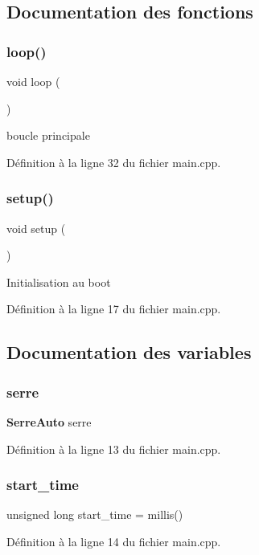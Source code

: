 \subsection{Documentation des fonctions}
\mbox{\label{main_8cpp_afe461d27b9c48d5921c00d521181f12f}} 
\subsubsection{loop()}
{\footnotesize\ttfamily void loop (\begin{DoxyParamCaption}{ }\end{DoxyParamCaption})}

boucle principale

Définition à la ligne 32 du fichier main.\+cpp.

\mbox{\label{main_8cpp_a4fc01d736fe50cf5b977f755b675f11d}} 
\subsubsection{setup()}
{\footnotesize\ttfamily void setup (\begin{DoxyParamCaption}{ }\end{DoxyParamCaption})}

Initialisation au boot

Définition à la ligne 17 du fichier main.\+cpp.



\subsection{Documentation des variables}
\mbox{\label{main_8cpp_a805cde1ecc3680fe8f6894aa9b38080d}} 
\subsubsection{serre}
{\footnotesize\ttfamily \textbf{ Serre\+Auto} serre}



Définition à la ligne 13 du fichier main.\+cpp.

\mbox{\label{main_8cpp_a07795b64998e93a085d14a540fbee91c}} 
\subsubsection{start\+\_\+time}
{\footnotesize\ttfamily unsigned long start\+\_\+time = millis()}



Définition à la ligne 14 du fichier main.\+cpp.

